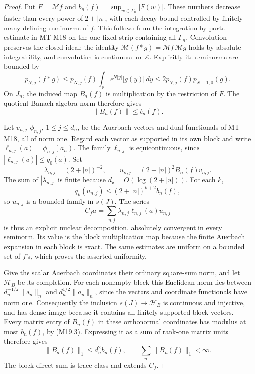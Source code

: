 \documentclass[11pt,a4paper]{article}
\begin{document}
\begin{proof}
Put \(F=\mathcal Mf\) and \(b_n(f)=\sup_{w\in\Gamma_n}|F(w)|\).
These numbers decrease faster than every power of \(2+|n|\),
with each decay bound controlled by finitely many defining
seminorms of \(f\). This follows from the integration-by-parts
estimate in MT-M18 on the one fixed strip containing all
\(\Gamma_n\). Convolution preserves the closed ideal: the
identity \(\mathcal M(f*g)=\mathcal Mf\,\mathcal Mg\) holds
by absolute integrability, and convolution is continuous on
\(\mathcal E\). Explicitly its seminorms are bounded by
\[
 p_{N,j}(f*g)
 \le p_{N,j}(f)\int_{\mathbb R}e^{N|y|}|g(y)|\,dy
 \le 2p_{N,j}(f)p_{N+1,0}(g).
\]
On \(J_n\), the induced map \(B_n(f)\) is multiplication by
the restriction of \(F\). The quotient Banach-algebra norm
therefore gives
\[
                      \|B_n(f)\|\le b_n(f).            \tag{M19.3}
\]

Let \(v_{n,j},\phi_{n,j}\), \(1\le j\le d_n\), be the
Auerbach vectors and dual functionals of MT-M18, all of norm
one. Regard each vector as supported in its own block and
write \(\ell_{n,j}(a)=\phi_{n,j}(a_n)\). The family
\(\ell_{n,j}\) is equicontinuous, since
\(|\ell_{n,j}(a)|\le q_0(a)\). Set
\[
 \lambda_{n,j}=(2+|n|)^{-2},\qquad
 u_{n,j}=(2+|n|)^2 B_n(f)v_{n,j}.
\]
The sum of \(|\lambda_{n,j}|\) is finite because
\(d_n=O(\log(2+|n|))\). For each \(k\),
\[
 q_k(u_{n,j})\le(2+|n|)^{k+2}b_n(f),
\]
so \(u_{n,j}\) is a bounded family in \(s(J)\). The series
\[
 C_f a=\sum_{n,j}\lambda_{n,j}\ell_{n,j}(a)u_{n,j}       \tag{M19.4}
\]
is thus an explicit nuclear decomposition, absolutely convergent
in every seminorm. Its value is the block multiplication map
because the finite Auerbach expansion in each block is exact.
The same estimates are uniform on a bounded set of \(f\)'s,
which proves the asserted uniformity.

Give the scalar Auerbach coordinates their ordinary square-sum
norm, and let \(\mathcal H_B\) be its completion. For each
nonempty block this Euclidean norm lies between
\(d_n^{-1/2}\|a_n\|_n\) and
\(d_n^{1/2}\|a_n\|_n\), since the vectors and coordinate
functionals have norm one. Consequently the inclusion
\(s(J)\to\mathcal H_B\) is continuous and injective, and
has dense image because it contains all finitely supported
block vectors. Every matrix entry of \(B_n(f)\) in these
orthonormal coordinates has modulus at most \(b_n(f)\),
by (M19.3). Expressing it as a sum of rank-one matrix units
therefore gives
\[
       \|B_n(f)\|_1\le d_n^2b_n(f),\qquad
       \sum_n\|B_n(f)\|_1<\infty.                     \tag{M19.5}
\]
The block direct sum is trace class and extends \(C_f\).


\end{proof}
\end{document}
